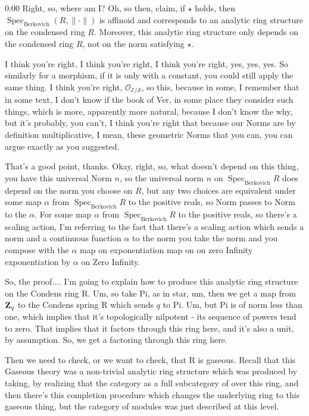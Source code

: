 \begin{unfinished}{0:00}
Right, so, where am I? Oh, so then, claim, if $\star$ holds, then $\operatorname{Spec}_{\mathrm{Berkovich}} (R, \|\cdot\|)$ is affinoid and corresponds to an analytic ring structure on the condensed ring $R$. Moreover, this analytic ring structure only depends on the condensed ring $R$, not on the norm satisfying $\star$.

I think you're right, I think you're right, I think you're right, yes, yes, yes. So similarly for a morphism, if it is only with a constant, you could still apply the same thing. I think you're right, $\mathcal{O}_{\mathcal{E}/\mathcal{S}}$, so this, because in some, I remember that in some text, I don't know if the book of Ver, in some place they consider such things, which is more, apparently more natural, because I don't know the why, but it's probably, you can't, I think you're right that because our Norms are by definition multiplicative, I mean, these geometric Norms that you can, you can argue exactly as you suggested.

That's a good point, thanks. Okay, right, so, what doesn't depend on this thing, you have this universal Norm $n$, so the universal norm $n$ on $\operatorname{Spec}_{\mathrm{Berkovich}} R$ does depend on the norm you choose on $R$, but any two choices are equivalent under some map $\alpha$ from $\operatorname{Spec}_{\mathrm{Berkovich}} R$ to the positive reals, so Norm passes to Norm to the $\alpha$. For some map $\alpha$ from $\operatorname{Spec}_{\mathrm{Berkovich}} R$ to the positive reals, so there's a scaling action, I'm referring to the fact that there's a scaling action which sends a norm and a continuous function $\alpha$ to the norm you take the norm and you compose with the $\alpha$ map on exponentiation map on on zero Infinity exponentiation by $\alpha$ on Zero Infinity.

So, the proof.... I'm going to explain how to produce this analytic ring structure on the Condens ring R. Um, so take Pi, as in star, um, then we get a map from $\mathbf Z_q$ to the Condens spring R which sends $q$ to Pi. Um, but Pi is of norm less than one, which implies that it's topologically nilpotent - its sequence of powers tend to zero. That implies that it factors through this ring here, and it's also a unit, by assumption. So, we get a factoring through this ring here.

Then we need to check, or we want to check, that R is gaseous. Recall that this Gaseous theory was a non-trivial analytic ring structure which was produced by taking, by realizing that the category as a full subcategory of over this ring, and then there's this completion procedure which changes the underlying ring to this gaseous thing, but the category of modules was just described at this level.


\end{unfinished}
